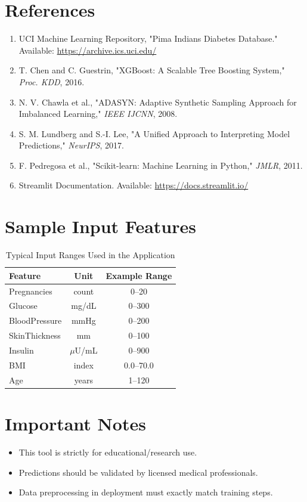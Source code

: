 \documentclass[12pt,a4paper]{report}
\begin{document}
\chapter*{References}

\begin{enumerate}[leftmargin=1cm]
    \item UCI Machine Learning Repository, "Pima Indians Diabetes Database." Available: \url{https://archive.ics.uci.edu/}
    \item T. Chen and C. Guestrin, "XGBoost: A Scalable Tree Boosting System," \textit{Proc. KDD}, 2016.
    \item N. V. Chawla et al., "ADASYN: Adaptive Synthetic Sampling Approach for Imbalanced Learning," \textit{IEEE IJCNN}, 2008.
    \item S. M. Lundberg and S.-I. Lee, "A Unified Approach to Interpreting Model Predictions," \textit{NeurIPS}, 2017.
    \item F. Pedregosa et al., "Scikit-learn: Machine Learning in Python," \textit{JMLR}, 2011.
    \item Streamlit Documentation. Available: \url{https://docs.streamlit.io/}
\end{enumerate}

\appendix
\chapter{Sample Input Features}

\begin{table}[H]
\centering
\caption{Typical Input Ranges Used in the Application}
\begin{tabular}{lcc}
\toprule
\textbf{Feature} & \textbf{Unit} & \textbf{Example Range} \\
\midrule
Pregnancies & count & 0--20 \\
Glucose & mg/dL & 0--300 \\
BloodPressure & mmHg & 0--200 \\
SkinThickness & mm & 0--100 \\
Insulin & $\mu$U/mL & 0--900 \\
BMI & index & 0.0--70.0 \\
Age & years & 1--120 \\
\bottomrule
\end{tabular}
\end{table}

\chapter{Important Notes}
\begin{itemize}[leftmargin=1.2cm]
    \item This tool is strictly for educational/research use.
    \item Predictions should be validated by licensed medical professionals.
    \item Data preprocessing in deployment must exactly match training steps.
\end{itemize}
\end{document}
